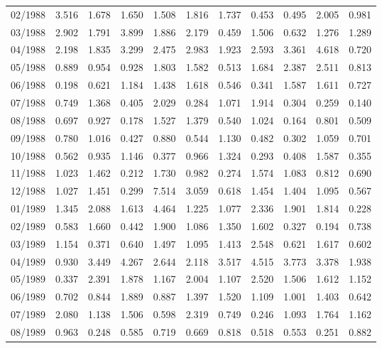 \begin{tabular}{lrrrrrrrrrr}
02/1988 &  3.516 &  1.678 &  1.650 &  1.508 &  1.816 &  1.737 &  0.453 &  0.495 &  2.005 &  0.981 \\
03/1988 &  2.902 &  1.791 &  3.899 &  1.886 &  2.179 &  0.459 &  1.506 &  0.632 &  1.276 &  1.289 \\
04/1988 &  2.198 &  1.835 &  3.299 &  2.475 &  2.983 &  1.923 &  2.593 &  3.361 &  4.618 &  0.720 \\
05/1988 &  0.889 &  0.954 &  0.928 &  1.803 &  1.582 &  0.513 &  1.684 &  2.387 &  2.511 &  0.813 \\
06/1988 &  0.198 &  0.621 &  1.184 &  1.438 &  1.618 &  0.546 &  0.341 &  1.587 &  1.611 &  0.727 \\
07/1988 &  0.749 &  1.368 &  0.405 &  2.029 &  0.284 &  1.071 &  1.914 &  0.304 &  0.259 &  0.140 \\
08/1988 &  0.697 &  0.927 &  0.178 &  1.527 &  1.379 &  0.540 &  1.024 &  0.164 &  0.801 &  0.509 \\
09/1988 &  0.780 &  1.016 &  0.427 &  0.880 &  0.544 &  1.130 &  0.482 &  0.302 &  1.059 &  0.701 \\
10/1988 &  0.562 &  0.935 &  1.146 &  0.377 &  0.966 &  1.324 &  0.293 &  0.408 &  1.587 &  0.355 \\
11/1988 &  1.023 &  1.462 &  0.212 &  1.730 &  0.982 &  0.274 &  1.574 &  1.083 &  0.812 &  0.690 \\
12/1988 &  1.027 &  1.451 &  0.299 &  7.514 &  3.059 &  0.618 &  1.454 &  1.404 &  1.095 &  0.567 \\
01/1989 &  1.345 &  2.088 &  1.613 &  4.464 &  1.225 &  1.077 &  2.336 &  1.901 &  1.814 &  0.228 \\
02/1989 &  0.583 &  1.660 &  0.442 &  1.900 &  1.086 &  1.350 &  1.602 &  0.327 &  0.194 &  0.738 \\
03/1989 &  1.154 &  0.371 &  0.640 &  1.497 &  1.095 &  1.413 &  2.548 &  0.621 &  1.617 &  0.602 \\
04/1989 &  0.930 &  3.449 &  4.267 &  2.644 &  2.118 &  3.517 &  4.515 &  3.773 &  3.378 &  1.938 \\
05/1989 &  0.337 &  2.391 &  1.878 &  1.167 &  2.004 &  1.107 &  2.520 &  1.506 &  1.612 &  1.152 \\
06/1989 &  0.702 &  0.844 &  1.889 &  0.887 &  1.397 &  1.520 &  1.109 &  1.001 &  1.403 &  0.642 \\
07/1989 &  2.080 &  1.138 &  1.506 &  0.598 &  2.319 &  0.749 &  0.246 &  1.093 &  1.764 &  1.162 \\
08/1989 &  0.963 &  0.248 &  0.585 &  0.719 &  0.669 &  0.818 &  0.518 &  0.553 &  0.251 &  0.882 \\

\end{tabular}
